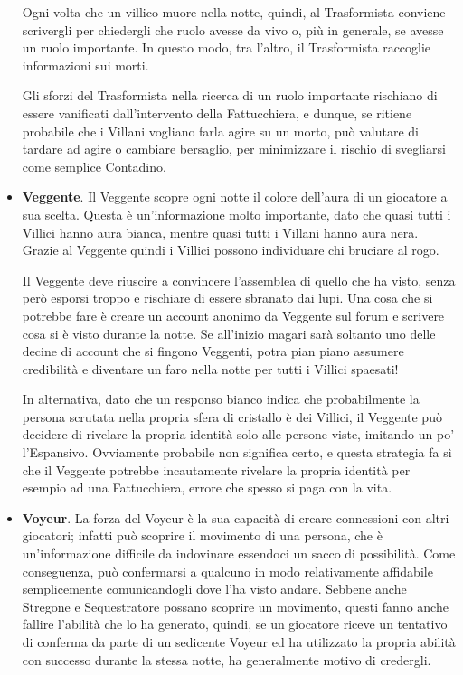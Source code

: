 \documentclass[a4paper,10pt]{article}
\begin{document}
\begin{itemize}
    Ogni volta che un villico muore nella notte, quindi, al Trasformista conviene scrivergli per chiedergli che ruolo avesse da vivo o, più in generale, se avesse un ruolo importante. In questo modo, tra l’altro, il Trasformista raccoglie informazioni sui morti.
    
    Gli sforzi del Trasformista nella ricerca di un ruolo importante rischiano di essere vanificati dall’intervento della Fattucchiera, e dunque, se ritiene probabile che i Villani vogliano farla agire su un morto, può valutare di tardare ad agire o cambiare bersaglio, per minimizzare il rischio di svegliarsi come semplice Contadino.
	
	\item {\bf Veggente}. Il Veggente scopre ogni notte il colore dell'aura di un giocatore a sua scelta.
    Questa è un'informazione molto importante, dato che quasi tutti i Villici hanno aura bianca, mentre quasi tutti i Villani hanno aura nera. Grazie al Veggente quindi i Villici possono individuare chi bruciare al rogo.
    
    Il Veggente deve riuscire a convincere l'assemblea di quello che ha visto, senza però esporsi troppo e rischiare di essere sbranato dai lupi. Una cosa che si potrebbe fare è creare un account anonimo da Veggente sul forum e scrivere cosa si è visto durante la notte. Se all'inizio magari sarà soltanto uno delle decine di account che si fingono Veggenti, potra pian piano assumere credibilità e diventare un faro nella notte per tutti i Villici spaesati!
    
    In alternativa, dato che un responso bianco indica che probabilmente la persona scrutata nella propria sfera di cristallo è dei Villici, il Veggente può decidere di rivelare la propria identità solo alle persone viste, imitando un po' l'Espansivo. Ovviamente probabile non significa certo, e questa strategia fa sì che il Veggente potrebbe incautamente rivelare la propria identità per esempio ad una Fattucchiera, errore che spesso si paga con la vita.
	
	\item {\bf Voyeur}. La forza del Voyeur è la sua capacità di creare connessioni con altri giocatori; infatti può scoprire il movimento di una persona, che è un'informazione difficile da indovinare essendoci un sacco di possibilità. Come conseguenza, può confermarsi a qualcuno in modo relativamente affidabile semplicemente comunicandogli dove l'ha visto andare. Sebbene anche Stregone e Sequestratore possano scoprire un movimento, questi fanno anche fallire l'abilità che lo ha generato, quindi, se un giocatore riceve un tentativo di conferma da parte di un sedicente Voyeur ed ha utilizzato la propria abilità con successo durante la stessa notte, ha generalmente motivo di credergli.
	

\end{itemize}
\end{document}
